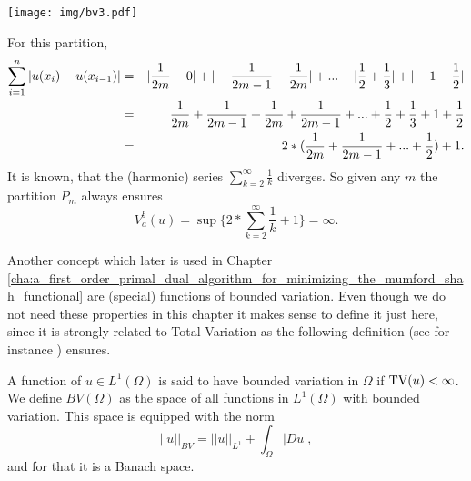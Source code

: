 \begin{example}
\begin{enumerate}
                \begin{center}
                     \texttt{[image: img/bv3.pdf]}
                \end{center}
            For this partition,
                \begin{eqnarray}
                    \sum_{i = 1}^{n} |u(x_{i}) - u(x_{i-1})| &=& |\frac{1}{2m} - 0| + |-\frac{1}{2m-1} - \frac{1}{2m}| + ... + |\frac{1}{2} + \frac{1}{3}| + |-1 - \frac{1}{2}| \notag \\
                    &=& \frac{1}{2m} + \frac{1}{2m-1} + \frac{1}{2m} + \frac{1}{2m-1} + ... + \frac{1}{2} + \frac{1}{3} + 1 + \frac{1}{2} \notag \\
                    &=& 2*(\frac{1}{2m} + \frac{1}{2m-1} + ... + \frac{1}{2}) + 1. \notag
                \end{eqnarray}
            It is known, that the (harmonic) series $\sum_{k = 2}^{\infty} \frac{1}{k}$ diverges. So given any $m$ the partition $P_{m}$ always ensures
                $$
                    V^{b}_{a}(u) = \sup \{ 2 * \sum_{k = 2}^{\infty} \frac{1}{k} + 1 \} = \infty.
                $$
        \end{enumerate}

    \end{example}

    Another concept which later is used in Chapter \ref{cha:a_first_order_primal_dual_algorithm_for_minimizing_the_mumford_shah_functional}
    are (special) functions of bounded variation. Even though we do not need these properties in this chapter it makes sense to define it just here, since it is strongly related to Total Variation as the following definition (see for instance \cite{Giusti}) ensures.

    \begin{definition}
    \label{def:functions_of_bounded_variation}

        A function of $u \in L^{1}(\Omega)$ is said to have bounded variation in $\Omega$ if $\textnormal{TV}(u) < \infty$. We define $BV(\Omega)$ as the space of all functions in $L^{1}(\Omega)$ with bounded variation. This space is equipped with the norm
            \begin{equation}
                ||u||_{BV} = ||u||_{L^{1}} + \int_{\Omega} |Du|,
            \end{equation}
        and for that it is a Banach space.
    
    \end{definition}

